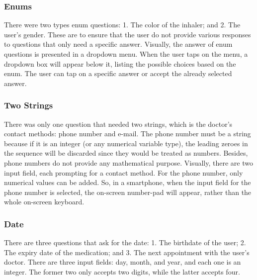 \subsubsection*{Enums}
There were two types enum questions: 1. The color of the inhaler; and 2. The user’s gender. These are to ensure that the user do not provide various responses to questions that only need a specific answer. Visually, the answer of enum questions is presented in a dropdown menu. When the user taps on the menu, a dropdown box will appear below it, listing the possible choices based on the enum. The user can tap on a specific answer or accept the already selected answer.

\subsubsection*{Two Strings}
There was only one question that needed two strings, which is the doctor’s contact methods: phone number and e-mail. The phone number must be a string because if it is an integer (or any numerical variable type), the leading zeroes in the sequence will be discarded since they would be treated as numbers. Besides, phone numbers do not provide any mathematical purpose. Visually, there are two input field, each prompting for a contact method. For the phone number, only numerical values can be added. So, in a smartphone, when the input field for the phone number is selected, the on-screen number-pad will appear, rather than the whole on-screen keyboard.

\subsubsection*{Date}
There are three questions that ask for the date: 1. The birthdate of the user; 2. The expiry date of the medication; and 3. The next appointment with the user’s doctor. There are three input fields: day, month, and year, and each one is an integer. The former two only accepts two digits, while the latter accepts four.

